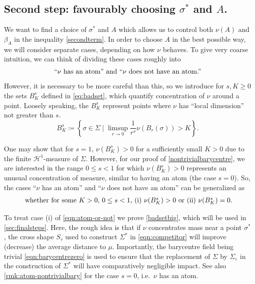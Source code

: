 \documentclass[preprint, reqno]{amsart}
\renewcommand{\epsilon}{\varepsilon}
\theoremstyle{definition}
\numberwithin{equation}{section}
\begin{document}
\subsection{Second step: favourably choosing $\sigma^*$ and
  $A$.}\label{sec:second-main-step} We want to find a choice of
$\sigma^*$ and $A$ which allows us to control both $\nu(A)$ and
$\beta_A$ in the inequality \eqref{secondterm}. In order to choose $A$
in the best possible way, we will consider separate cases, depending
on how $\nu$ behaves. To give very coarse intuition, we can think of
dividing these cases roughly into
\begin{align*}
  \hbox{``$\nu$ has an atom'' and ``$\nu$
  does not have an atom.''}
\end{align*}
However, it is necessary to be more careful than this, so we
introduce for $s, K \geq 0$ the sets $B_K^s$ defined in
\eqref{eq:badset}, which quantify concentration of $\nu$ around a
point. Loosely speaking, the $B_K^s$ represent points where $\nu$
has ``local dimension'' not greater than $s$.
\begin{equation}\label{eq:badset}
  B_K^s \coloneqq \left\{\sigma \in \Sigma \mid \limsup_{r\to 0}
    \frac{1}{r^s} \nu(B_r(\sigma)) > K\right\}.
\end{equation}

One may show that for $s=1$, $\nu (B^s_K) >0$ for a sufficiently small
$K>0$ due to the finite $\mathcal{H}^1$-measure of $\Sigma$. However,
for our proof of \cref{nontrivialbarycentre}, we are interested in the
range $0\le s <1$ for which $\nu(B^s_K)>0$ represents an unusual
concentration of measure, similar to having an atom (the case $s=0$).
So, the cases ``$\nu$ has an atom'' and ``$\nu$ does not have an
atom'' can be generalized as
\begin{align}\label{eqn:atom-or-not}
  \hbox{ whether for some $K>0$, $0\le s <1$, (i) $\nu(B^s_K)>0$ or
  (ii) $\nu(B^s_K)=0$.}
\end{align}

To treat case (i) of \eqref{eqn:atom-or-not} we prove
\cref{badsetbig}, which will be used in \cref{sec:finalsteps}. Here,
the rough idea is that if $\nu$ concentrates mass near a point
$\sigma^*$, the cross shape $S_\tau$ used to construct $\Sigma^*$ in
\eqref{eqn:competitor} will improve (decrease) the average distance to
$\mu$. Importantly, the barycentre field being trivial
\eqref{eqn:barycentrezero} is used to ensure that the replacement of
$\Sigma$ by $\Sigma_\epsilon$ in the construction of $\Sigma^*$ will
have comparatively negligible impact. See also
\cref{rmk:atom-nontrivialbary} for the case $s=0$, i.e.\ $\nu$ has an
atom.
\end{document}
